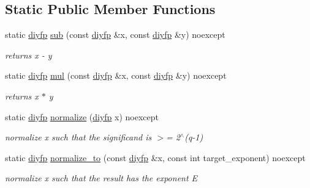 \subsection*{Static Public Member Functions}
\begin{DoxyCompactItemize}
\item 
static \mbox{\hyperlink{structnlohmann_1_1detail_1_1dtoa__impl_1_1diyfp}{diyfp}} \mbox{\hyperlink{structnlohmann_1_1detail_1_1dtoa__impl_1_1diyfp_aeb26771af54ad73598c1a0430d65d884}{sub}} (const \mbox{\hyperlink{structnlohmann_1_1detail_1_1dtoa__impl_1_1diyfp}{diyfp}} \&x, const \mbox{\hyperlink{structnlohmann_1_1detail_1_1dtoa__impl_1_1diyfp}{diyfp}} \&y) noexcept
\begin{DoxyCompactList}\small\item\em returns x -\/ y \end{DoxyCompactList}\item 
static \mbox{\hyperlink{structnlohmann_1_1detail_1_1dtoa__impl_1_1diyfp}{diyfp}} \mbox{\hyperlink{structnlohmann_1_1detail_1_1dtoa__impl_1_1diyfp_aa5f250d12ce89c81fdb08900c6a823e8}{mul}} (const \mbox{\hyperlink{structnlohmann_1_1detail_1_1dtoa__impl_1_1diyfp}{diyfp}} \&x, const \mbox{\hyperlink{structnlohmann_1_1detail_1_1dtoa__impl_1_1diyfp}{diyfp}} \&y) noexcept
\begin{DoxyCompactList}\small\item\em returns x $\ast$ y \end{DoxyCompactList}\item 
static \mbox{\hyperlink{structnlohmann_1_1detail_1_1dtoa__impl_1_1diyfp}{diyfp}} \mbox{\hyperlink{structnlohmann_1_1detail_1_1dtoa__impl_1_1diyfp_a2246b5b40c7c6992153ef174063d6aa6}{normalize}} (\mbox{\hyperlink{structnlohmann_1_1detail_1_1dtoa__impl_1_1diyfp}{diyfp}} x) noexcept
\begin{DoxyCompactList}\small\item\em normalize x such that the significand is $>$= 2$^\wedge$(q-\/1) \end{DoxyCompactList}\item 
static \mbox{\hyperlink{structnlohmann_1_1detail_1_1dtoa__impl_1_1diyfp}{diyfp}} \mbox{\hyperlink{structnlohmann_1_1detail_1_1dtoa__impl_1_1diyfp_a6b6665e467ebabe0c0f7418d3fe4b118}{normalize\+\_\+to}} (const \mbox{\hyperlink{structnlohmann_1_1detail_1_1dtoa__impl_1_1diyfp}{diyfp}} \&x, const int target\+\_\+exponent) noexcept
\begin{DoxyCompactList}\small\item\em normalize x such that the result has the exponent E \end{DoxyCompactList}\end{DoxyCompactItemize}
